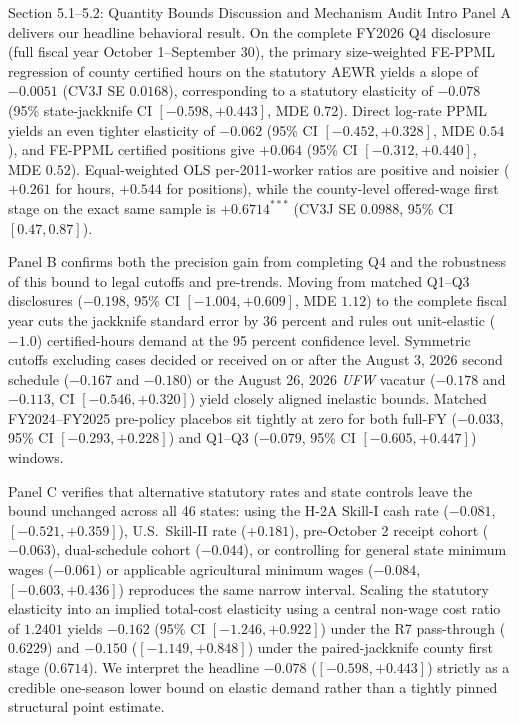 \begin{llmdraft}{Section 5.1--5.2: Quantity Bounds Discussion and Mechanism Audit Intro}
Panel A delivers our headline behavioral result. On the complete FY2026 Q4
disclosure (full fiscal year October 1--September 30), the primary
size-weighted FE-PPML regression of county certified hours on the statutory
AEWR yields a slope of $-0.0051$ (CV3J SE $0.0168$), corresponding to a
statutory elasticity of $-0.078$ (95\% state-jackknife CI $[-0.598,
+0.443]$, MDE $0.72$). Direct log-rate PPML yields an even tighter elasticity
of $-0.062$ (95\% CI $[-0.452, +0.328]$, MDE $0.54$), and FE-PPML certified
positions give $+0.064$ (95\% CI $[-0.312, +0.440]$, MDE $0.52$). Equal-weighted
OLS per-2011-worker ratios are positive and noisier ($+0.261$ for hours,
$+0.544$ for positions), while the county-level offered-wage first stage on the
exact same sample is $+0.6714^{***}$ (CV3J SE $0.0988$, 95\% CI $[0.47, 0.87]$).

Panel B confirms both the precision gain from completing Q4 and the robustness
of this bound to legal cutoffs and pre-trends. Moving from matched Q1--Q3
disclosures ($-0.198$, 95\% CI $[-1.004, +0.609]$, MDE $1.12$) to the complete
fiscal year cuts the jackknife standard error by 36 percent and rules out
unit-elastic ($-1.0$) certified-hours demand at the 95 percent confidence
level. Symmetric cutoffs excluding cases decided or received on or after the
August 3, 2026 second schedule ($-0.167$ and $-0.180$) or the August 26, 2026
\emph{UFW} vacatur ($-0.178$ and $-0.113$, CI $[-0.546, +0.320]$) yield closely
aligned inelastic bounds. Matched FY2024--FY2025 pre-policy placebos sit
tightly at zero for both full-FY ($-0.033$, 95\% CI $[-0.293, +0.228]$) and
Q1--Q3 ($-0.079$, 95\% CI $[-0.605, +0.447]$) windows.

Panel C verifies that alternative statutory rates and state controls leave the
bound unchanged across all 46 states: using the H-2A Skill-I cash rate
($-0.081$, $[-0.521, +0.359]$), U.S.\ Skill-II rate ($+0.181$), pre-October 2
receipt cohort ($-0.063$), dual-schedule cohort ($-0.044$), or controlling for
general state minimum wages ($-0.061$) or applicable agricultural minimum wages
($-0.084$, $[-0.603, +0.436]$) reproduces the same narrow interval. Scaling
the statutory elasticity into an implied total-cost elasticity using a central
non-wage cost ratio of $1.2401$ yields $-0.162$ (95\% CI $[-1.246, +0.922]$)
under the R7 pass-through ($0.6229$) and $-0.150$ ($[-1.149, +0.848]$) under
the paired-jackknife county first stage ($0.6714$). We interpret the headline
$-0.078$ ($[-0.598, +0.443]$) strictly as a credible one-season lower bound on
elastic demand rather than a tightly pinned structural point estimate.


\end{llmdraft}
